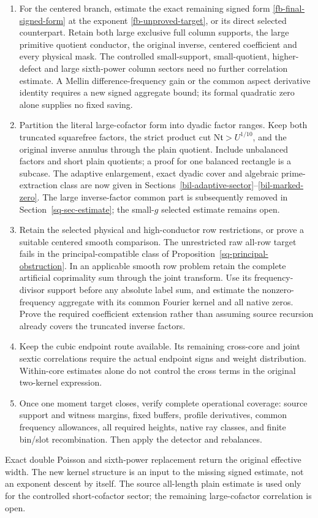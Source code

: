 \documentclass[11pt]{article}
\theoremstyle{definition}
\newcommand{\N}{\mathrm N}
\begin{document}
\begin{enumerate}
\item For the centered branch, estimate the exact remaining signed form
\eqref{fb-final-signed-form} at the exponent \eqref{fb-unproved-target},
or its direct selected counterpart. Retain both large exclusive full
column supports, the large primitive quotient conductor, the original
inverse, centered coefficient and every physical mask. The controlled
small-support, small-quotient, higher-defect and large sixth-power
column sectors need no further correlation estimate. A Mellin difference-frequency gain or the common aspect
derivative identity requires a new signed aggregate bound; its formal
quadratic zero alone supplies no fixed saving.
\item Partition the literal large-cofactor form into dyadic factor ranges.
Keep both truncated squarefree factors, the strict product cut
$\N\mathfrak t>U^{1/10}$, and the original inverse annulus through the
plain quotient. Include unbalanced factors and short plain quotients;
a proof for one balanced rectangle is a subcase. The adaptive enlargement,
exact dyadic cover and algebraic prime-extraction class are now given in
Sections~\ref{bil-adaptive-sector}--\ref{bil-marked-zero}. The large inverse-factor common part is subsequently removed in
Section~\ref{sq-sec-estimate}; the small-$g$ selected estimate remains open.
\item Retain the selected physical and high-conductor row restrictions,
or prove a suitable centered smooth comparison. The unrestricted raw
all-row target fails in the principal-compatible class of
Proposition~\ref{sq-principal-obstruction}. In an applicable smooth row
problem retain the complete artificial
coprimality sum through the joint transform. Use its frequency-divisor
support before any absolute label sum, and estimate the nonzero-frequency
aggregate with its common Fourier kernel and all native zeros. Prove the
required coefficient extension rather than assuming source recursion
already covers the truncated inverse factors.
\item Keep the cubic endpoint route available. Its remaining cross-core
and joint sextic correlations require the actual endpoint signs and
weight distribution. Within-core estimates alone do not control the
cross terms in the original two-kernel expression.
\item Once one moment target closes, verify complete operational coverage:
source support and witness margins, fixed buffers, profile derivatives,
common frequency allowances, all required heights, native ray classes,
and finite bin/slot recombination. Then apply the detector and rebalances.
\end{enumerate}
Exact double Poisson and sixth-power replacement return the original
effective width. The new kernel structure is an input to the missing
signed estimate, not an exponent descent by itself. The source all-length
plain estimate is used only for the controlled short-cofactor sector;
the remaining large-cofactor correlation is open.
\end{document}
